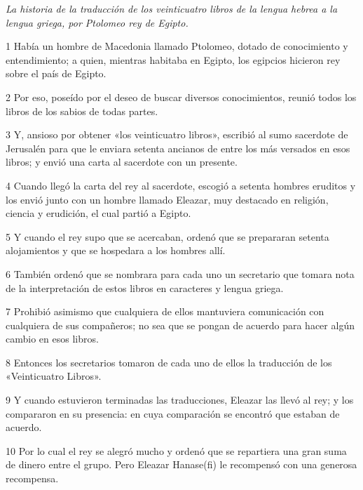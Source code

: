 \par \textit{La historia de la traducción de los veinticuatro libros de la lengua hebrea a la lengua griega, por Ptolomeo rey de Egipto.}

\par 1 Había un hombre de Macedonia llamado Ptolomeo, dotado de conocimiento y entendimiento; a quien, mientras habitaba en Egipto, los egipcios hicieron rey sobre el país de Egipto.

\par 2 Por eso, poseído por el deseo de buscar diversos conocimientos, reunió todos los libros de los sabios de todas partes.

\par 3 Y, ansioso por obtener «los veinticuatro libros», escribió al sumo sacerdote de Jerusalén para que le enviara setenta ancianos de entre los más versados ​​en esos libros; y envió una carta al sacerdote con un presente.

\par 4 Cuando llegó la carta del rey al sacerdote, escogió a setenta hombres eruditos y los envió junto con un hombre llamado Eleazar, muy destacado en religión, ciencia y erudición, el cual partió a Egipto.

\par 5 Y cuando el rey supo que se acercaban, ordenó que se prepararan setenta alojamientos y que se hospedara a los hombres allí.

\par 6 También ordenó que se nombrara para cada uno un secretario que tomara nota de la interpretación de estos libros en caracteres y lengua griega.

\par 7 Prohibió asimismo que cualquiera de ellos mantuviera comunicación con cualquiera de sus compañeros; no sea que se pongan de acuerdo para hacer algún cambio en esos libros.

\par 8 Entonces los secretarios tomaron de cada uno de ellos la traducción de los «Veinticuatro Libros».

\par 9 Y cuando estuvieron terminadas las traducciones, Eleazar las llevó al rey; y los compararon en su presencia: en cuya comparación se encontró que estaban de acuerdo.

\par 10 Por lo cual el rey se alegró mucho y ordenó que se repartiera una gran suma de dinero entre el grupo. Pero Eleazar Hanase(fi) le recompensó con una generosa recompensa.

